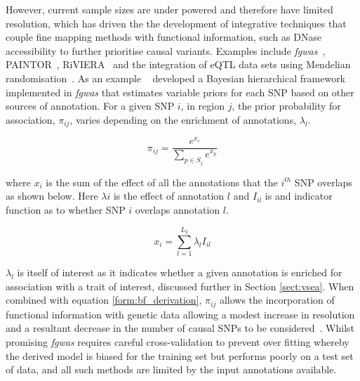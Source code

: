 \documentclass[a4paper,11pt]{report}
\begin{document}
However, current sample sizes are under powered and therefore have limited resolution, which has driven the the development of integrative techniques that couple fine mapping methods with functional information, such as DNase accessibility to further prioritise causal variants. Examples include \textit{fgwas}~\citep{Pickrell2014-xs}, PAINTOR~\citep{KichaevYangLindstromEtAl2014}, RiVIERA~\citep{LiKellis2016}   and the integration of eQTL data sets using Mendelian randomisation~\citep{ZhuZhangHuEtAl2016}. As an example ~\citet{Pickrell2014-xs} developed a Bayesian hierarchical framework implemented in \textit{fgwas} that estimates variable priors for each SNP based on other sources of annotation. For a given SNP $i$, in region $j$, the prior probability for association, $\pi_{ij}$, varies depending on the enrichment of annotations, $\lambda_{l}$. 

\begin{equation}
	\pi_{ij} = \frac{e^{x_{i}}}{\sum_{p \in S_j}e^{x_{p}}}
	\label{eqn:fgwas_var_prior}
\end{equation}

where $x_i$ is the sum of the effect of all the annotations that the $i^{th}$ SNP overlaps as shown below.  Here $\lambda{i}$ is the effect of annotation $l$ and $I_{il}$ is and indicator function as to whether SNP $i$ overlaps annotation $l$.  

\begin{equation}
	x_{i} = \sum_{l=1}^{L_{2}} \lambda_{l}I_{il}
	\label{eqn:fgwas_lambda}
\end{equation}

$\lambda_{l}$ is itself of interest as it indicates whether a given annotation is enriched for association with a trait of interest, discussed further in Section \ref{sect:vsea}. When combined with equation \ref{form:bf_derivation}, $\pi_{ij}$ allows the incorporation of functional information with genetic data allowing a modest increase in resolution and a resultant decrease in the number of causal SNPs to be considered~\citep{Pickrell2014-xs}. Whilst promising \textit{fgwas} requires careful cross-validation to prevent over fitting whereby the derived model is biased for the training set but performs poorly on a test set of data, and all such methods are limited by the input annotations available.
\end{document}
